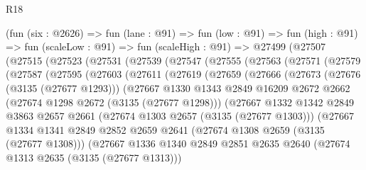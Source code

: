 \begin{lexlean}{R18}
\begin{coremodule}
    (fun (six : @2626) =>
    fun (lane : @91) =>
    fun (low : @91) =>
    fun (high : @91) =>
    fun (scaleLow : @91) =>
    fun (scaleHigh : @91) =>
    @27499
      (@27507
        (@27515
          (@27523
            (@27531
              (@27539
                (@27547
                  (@27555
                    (@27563
                      (@27571
                        (@27579
                          (@27587
                            (@27595
                              (@27603
                                (@27611
                                  (@27619
                                    (@27659
                                      (@27666
                                        (@27673
                                          (@27676 (@3135 (@27677 @1293)))
                                          (@27667
                                            @1330
                                            @1343
                                            @2849
                                            @16209
                                            @2672
                                            @2662
                                            (@27674 @1298 @2672 (@3135 (@27677 @1298)))
                                            (@27667
                                              @1332
                                              @1342
                                              @2849
                                              @3863
                                              @2657
                                              @2661
                                              (@27674 @1303 @2657 (@3135 (@27677 @1303)))
                                              (@27667
                                                @1334
                                                @1341
                                                @2849
                                                @2852
                                                @2659
                                                @2641
                                                (@27674 @1308 @2659 (@3135 (@27677 @1308)))
                                                (@27667
                                                  @1336
                                                  @1340
                                                  @2849
                                                  @2851
                                                  @2635
                                                  @2640
                                                  (@27674 @1313 @2635 (@3135 (@27677 @1313)))

\end{coremodule}
\end{lexlean}

